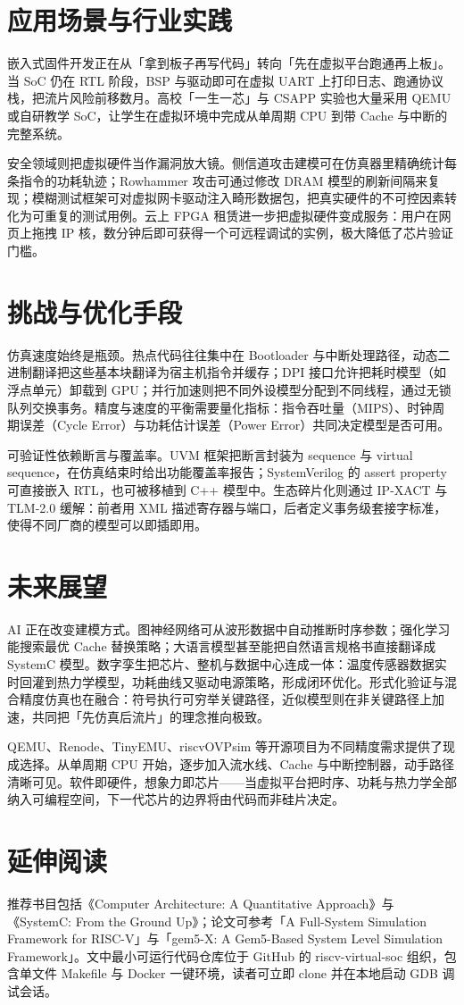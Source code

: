 \chapter{应用场景与行业实践}
嵌入式固件开发正在从「拿到板子再写代码」转向「先在虚拟平台跑通再上板」。当 SoC 仍在 RTL 阶段，BSP 与驱动即可在虚拟 UART 上打印日志、跑通协议栈，把流片风险前移数月。高校「一生一芯」与 CSAPP 实验也大量采用 QEMU 或自研教学 SoC，让学生在虚拟环境中完成从单周期 CPU 到带 Cache 与中断的完整系统。\par
安全领域则把虚拟硬件当作漏洞放大镜。侧信道攻击建模可在仿真器里精确统计每条指令的功耗轨迹；Rowhammer 攻击可通过修改 DRAM 模型的刷新间隔来复现；模糊测试框架可对虚拟网卡驱动注入畸形数据包，把真实硬件的不可控因素转化为可重复的测试用例。云上 FPGA 租赁进一步把虚拟硬件变成服务：用户在网页上拖拽 IP 核，数分钟后即可获得一个可远程调试的实例，极大降低了芯片验证门槛。\par
\chapter{挑战与优化手段}
仿真速度始终是瓶颈。热点代码往往集中在 Bootloader 与中断处理路径，动态二进制翻译把这些基本块翻译为宿主机指令并缓存；DPI 接口允许把耗时模型（如浮点单元）卸载到 GPU；并行加速则把不同外设模型分配到不同线程，通过无锁队列交换事务。精度与速度的平衡需要量化指标：指令吞吐量（MIPS）、时钟周期误差（Cycle Error）与功耗估计误差（Power Error）共同决定模型是否可用。\par
可验证性依赖断言与覆盖率。UVM 框架把断言封装为 sequence 与 virtual sequence，在仿真结束时给出功能覆盖率报告；SystemVerilog 的 assert property 可直接嵌入 RTL，也可被移植到 C++ 模型中。生态碎片化则通过 IP-XACT 与 TLM-2.0 缓解：前者用 XML 描述寄存器与端口，后者定义事务级套接字标准，使得不同厂商的模型可以即插即用。\par
\chapter{未来展望}
AI 正在改变建模方式。图神经网络可从波形数据中自动推断时序参数；强化学习能搜索最优 Cache 替换策略；大语言模型甚至能把自然语言规格书直接翻译成 SystemC 模型。数字孪生把芯片、整机与数据中心连成一体：温度传感器数据实时回灌到热力学模型，功耗曲线又驱动电源策略，形成闭环优化。形式化验证与混合精度仿真也在融合：符号执行可穷举关键路径，近似模型则在非关键路径上加速，共同把「先仿真后流片」的理念推向极致。\par
QEMU、Renode、TinyEMU、riscvOVPsim 等开源项目为不同精度需求提供了现成选择。从单周期 CPU 开始，逐步加入流水线、Cache 与中断控制器，动手路径清晰可见。软件即硬件，想象力即芯片——当虚拟平台把时序、功耗与热力学全部纳入可编程空间，下一代芯片的边界将由代码而非硅片决定。\par
\chapter{延伸阅读}
推荐书目包括《Computer Architecture: A Quantitative Approach》与《SystemC: From the Ground Up》；论文可参考「A Full-System Simulation Framework for RISC-V」与「gem5-X: A Gem5-Based System Level Simulation Framework」。文中最小可运行代码仓库位于 GitHub 的 riscv-virtual-soc 组织，包含单文件 Makefile 与 Docker 一键环境，读者可立即 clone 并在本地启动 GDB 调试会话。\par
